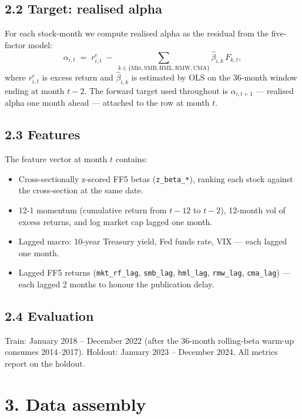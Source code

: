 \documentclass[
  letterpaper,
  DIV=11,
  numbers=noendperiod]{scrartcl}
\providecommand{\tightlist}{%
  \setlength{\itemsep}{0pt}\setlength{\parskip}{0pt}}
\begin{document}
\subsection{2.2 Target: realised alpha}\label{target-realised-alpha}

For each stock-month we compute realised alpha as the residual from the
five-factor model: \[
\alpha_{i,t} \;=\; r^e_{i,t} \;-\; \sum_{k \in \{\text{Mkt},\text{SMB},\text{HML},\text{RMW},\text{CMA}\}} \hat\beta_{i,k}\, F_{k,t},
\] where \(r^e_{i,t}\) is excess return and \(\hat\beta_{i,k}\) is
estimated by OLS on the 36-month window ending at month \(t-2\). The
forward target used throughout is \(\alpha_{i,t+1}\) --- realised alpha
one month ahead --- attached to the row at month \(t\).

\subsection{2.3 Features}\label{features}

The feature vector at month \(t\) contains:

\begin{itemize}
\tightlist
\item
  Cross-sectionally z-scored FF5 betas (\texttt{z\_beta\_*}), ranking
  each stock against the cross-section at the same date.
\item
  12-1 momentum (cumulative return from \(t-12\) to \(t-2\)), 12-month
  vol of excess returns, and log market cap lagged one month.
\item
  Lagged macro: 10-year Treasury yield, Fed funds rate, VIX --- each
  lagged one month.
\item
  Lagged FF5 returns (\texttt{mkt\_rf\_lag}, \texttt{smb\_lag},
  \texttt{hml\_lag}, \texttt{rmw\_lag}, \texttt{cma\_lag}) --- each
  lagged 2 months to honour the publication delay.
\end{itemize}

\subsection{2.4 Evaluation}\label{evaluation}

Train: January 2018 -- December 2022 (after the 36-month rolling-beta
warm-up consumes 2014--2017). Holdout: January 2023 -- December 2024.
All metrics report on the holdout.

\section{3. Data assembly}\label{data-assembly}
\end{document}
